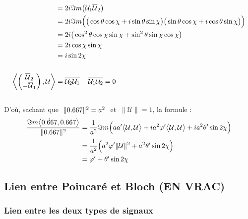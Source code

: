 \begin{demo}
\begin{align*}
		&= 2i\Im m\big(\mathcal{U}_1 \overline{\mathcal{U}}_2\big) \\
		&= 2i\Im m\Big(\big( \cos\theta \cos\chi + i \sin\theta \sin\chi \big) \big( \sin\theta \cos\chi + i \cos\theta \sin\chi \big)\Big) \\
		&= 2i\big(\cos^2\theta \cos\chi \sin\chi + \sin^2\theta \sin\chi \cos\chi \big) \\
		&= 2i \cos\chi \sin\chi \\
		&= i\sin2\chi 
		\\ \\
		\left\langle \begin{pmatrix} \overline{\mathcal{U}}_2 \\ -\overline{\mathcal{U}}_1 \end{pmatrix}, \mathcal{U} \right\rangle &= \overline{\mathcal{U}_2\mathcal{U}_1} - \overline{\mathcal{U}_1\mathcal{U}_2} = 0
	\end{align*}
	\\
	D'où, sachant que $\ \|\x\|^2=a^2\ $ et $\ \|\mathcal{U}\|=1$, la formule :
	\begin{align*}
		\frac{\Im m\big\langle \dot{\x}, \x\big\rangle}{\|\x\|^2} &= \frac{1}{a^2}\Im m\Big(aa' \big\langle \mathcal{U}, \mathcal{U}\big\rangle  + ia^2\varphi' \big\langle \mathcal{U}, \mathcal{U}\big\rangle + ia^2\theta' \sin2\chi \Big) \\
		&= \frac{1}{a^2} \Big( a^2\varphi' \|\mathcal{U}\|^2 + a^2\theta' \sin2\chi \Big) \\
		&= \varphi' + \theta' \sin2\chi
	\end{align*}
\end{demo}
\skipl


\subsection{Lien entre Poincaré et Bloch (EN VRAC)}

\subsubsection{Lien entre les deux types de signaux}

